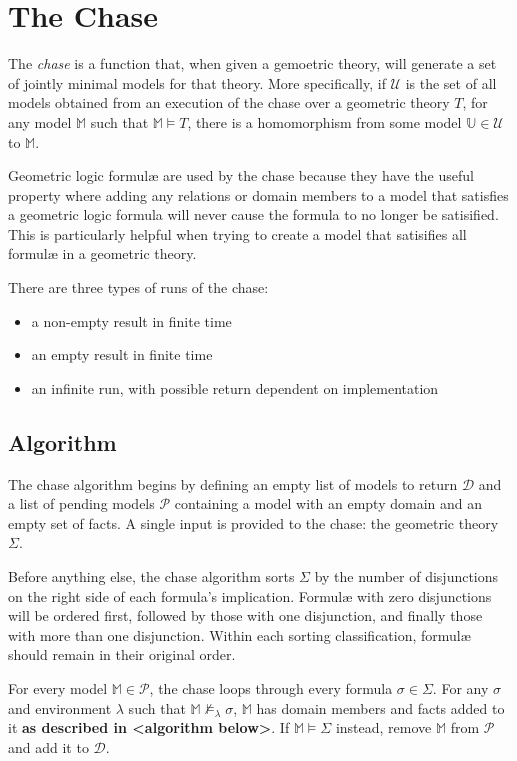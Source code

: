 \section{The Chase}

	The \emph{chase} is a function that, when given a gemoetric theory, will
	generate a set of jointly minimal models for that theory. More
	specifically, if $\mathcal{U}$ is the set of all models obtained from an
	execution of the chase over a geometric theory $T$, for any model
	$\mathbb{M}$ such that $\mathbb{M} \models T$, there is a homomorphism from
	some model $\mathbb{U} \in \mathcal{U}$ to $\mathbb{M}$.

	Geometric logic formul{\ae} are used by the chase because they have the
	useful property where adding any relations or domain members to a model
	that satisfies a geometric logic formula will never cause the formula to no
	longer be satisified. This is particularly helpful when trying to create a
	model that satisifies all formul{\ae} in a geometric theory.

	There are three types of runs of the chase:
	\begin{itemize}
	\item a non-empty result in finite time
	\item an empty result in finite time
	\item an infinite run, with possible return dependent on implementation
	\end{itemize}

	\subsection{Algorithm}

		The chase algorithm begins by defining an empty list of models to
		return $\mathcal{D}$ and a list of pending models $\mathcal{P}$
		containing a model with an empty domain and an empty set of facts. A
		single input is provided to the chase: the geometric theory $\Sigma$.

		Before anything else, the chase algorithm sorts $\Sigma$ by the
		number of disjunctions on the right side of each formula's implication.
		Formul{\ae} with zero disjunctions will be ordered first, followed by
		those with one disjunction, and finally those with more than one
		disjunction. Within each sorting classification, formul{\ae} should
		remain in their original order.

		For every model $\mathbb{M} \in \mathcal{P}$, the chase loops through
		every formula $\sigma \in \Sigma$. For any $\sigma$ and environment
		$\lambda$ such that $\mathbb{M} \not\models_\lambda \sigma$,
		$\mathbb{M}$ has domain members and facts added to it \textbf{as
		described in <algorithm below>}. If $\mathbb{M} \models \Sigma$
		instead, remove $\mathbb{M}$ from $\mathcal{P}$ and add it to
		$\mathcal{D}$.

